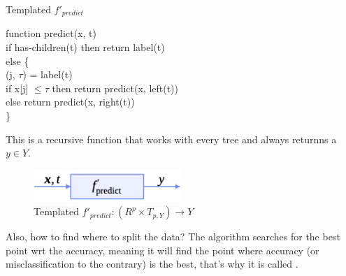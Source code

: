 \begin{center}
    \begin{algorithm}
        \caption{Templated $f'_{predict}$}
        function predict(x, t)\\
        \hspace{1cm} if \neg has-children(t) then return label(t)\\
        \hspace{1cm} else \{\\
            \hspace{2cm}(j, $\tau$) = label(t)\\
            \hspace{2cm}if x[j] $\leq \tau$ then return predict(x, left(t))\\
            \hspace{2cm}else return predict(x, right(t))\\
        \hspace{1cm}\}
    \end{algorithm}
\end{center}

This is a recursive function that works with every tree and always returnns a $y \in Y$.

\begin{center}
    \begin{figure}[H]
        \centering
        \includegraphics[width=0.5\textwidth]{assets/fig13.png}
        \caption{Templated $f'_{predict} : (R^p \times T_{p,Y}) \to Y$}
    \end{figure}
\end{center}


Also, how to find where to split the data? The algorithm searches for the best point wrt the accuracy, meaning it will find the point where accuracy (or misclassification to the contrary) is the best, that's why it is called .

